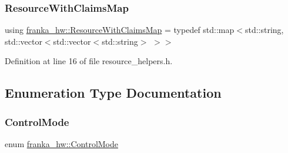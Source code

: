 \subsubsection{\texorpdfstring{Resource\+With\+Claims\+Map}{ResourceWithClaimsMap}}
{\footnotesize\ttfamily using \hyperlink{namespacefranka__hw_a1fae0c56c9a08fdeb137e601f876cc77}{franka\+\_\+hw\+::\+Resource\+With\+Claims\+Map} = typedef std\+::map$<$std\+::string, std\+::vector$<$std\+::vector$<$std\+::string$>$ $>$$>$}



Definition at line 16 of file resource\+\_\+helpers.\+h.



\subsection{Enumeration Type Documentation}
\mbox{\label{namespacefranka__hw_afa416558ce4baace5ac6c71bd5d2c98c}} 
\subsubsection{\texorpdfstring{Control\+Mode}{ControlMode}}
{\footnotesize\ttfamily enum \hyperlink{namespacefranka__hw_afa416558ce4baace5ac6c71bd5d2c98c}{franka\+\_\+hw\+::\+Control\+Mode}\hspace{0.3cm}{\ttfamily [strong]}}

